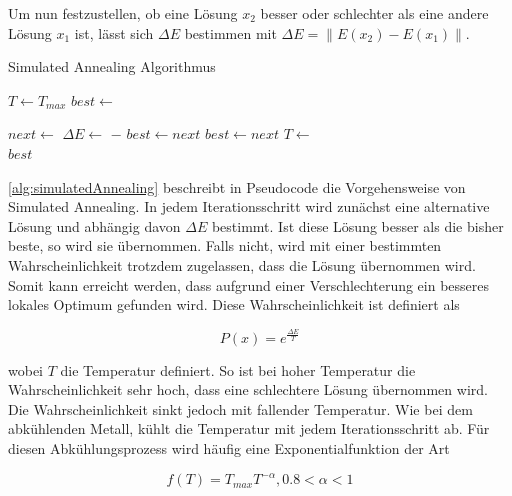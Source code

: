 		Um nun festzustellen, ob eine Lösung $x_{2}$ besser oder schlechter als eine andere Lösung $x_{1}$ ist, lässt sich $\varDelta E$ bestimmen mit $\varDelta E = \left\| E\left(x_{2}\right) - E\left(x_{1}\right) \right\|$. 
		
		\begin{algorithm}
			\caption{Simulated Annealing Algorithmus \cite{S.Kirkpatrick.1983}}
			\label{alg:simulatedAnnealing}
			\begin{algorithmic}
				\State $T\gets T_{max}$
				\State $best\gets$ \textbf{}
				
				\State $next\gets $ \textbf{}
				\State $\Delta E\gets$ \textbf{} $-$ \textbf{}
				\State $best\gets next$
				\State $best\gets next$
				\EndIf
				\State $T\gets$ \textbf{}
				\EndWhile \\
				\Return $best$
			\end{algorithmic}
		\end{algorithm}	
		
		
		\autoref{alg:simulatedAnnealing} beschreibt in Pseudocode die Vorgehensweise von Simulated Annealing. In jedem Iterationsschritt wird zunächst eine alternative Lösung und abhängig davon $\varDelta E$ bestimmt. Ist diese Lösung besser als die bisher beste, so wird sie übernommen. Falls nicht, wird mit einer bestimmten Wahrscheinlichkeit trotzdem zugelassen, dass die Lösung übernommen wird. Somit kann erreicht werden, dass aufgrund einer Verschlechterung ein besseres lokales Optimum gefunden wird. Diese Wahrscheinlichkeit ist definiert als
		
		\begin{equation}
			P \left(x\right) = e^{\frac{\varDelta E}{T}}
		\end{equation}
		
		wobei $T$ die Temperatur definiert. So ist bei hoher Temperatur die Wahrscheinlichkeit sehr hoch, dass eine schlechtere Lösung übernommen wird. Die Wahrscheinlichkeit sinkt jedoch mit fallender Temperatur. Wie bei dem abkühlenden Metall, kühlt die Temperatur mit jedem Iterationsschritt ab. Für diesen Abkühlungsprozess wird häufig eine Exponentialfunktion der Art 
		
		\begin{equation}
			f(T) = T_{max} T^{-\alpha}, 0.8 < \alpha < 1
		\end{equation}
				
